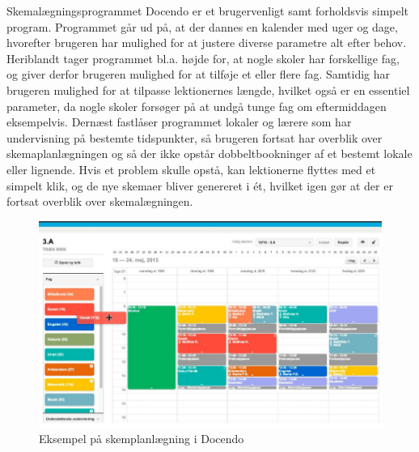 Skemalægningsprogrammet Docendo er et brugervenligt samt forholdsvis simpelt program. Programmet går ud på, at der dannes en kalender med uger og dage, hvorefter brugeren har mulighed for at justere diverse parametre alt efter behov. Heriblandt tager programmet bl.a. højde for, at nogle skoler har forskellige fag, og giver derfor brugeren mulighed for at tilføje et eller flere fag. Samtidig har brugeren mulighed for at tilpasse lektionernes længde, hvilket også er en essentiel parameter, da nogle skoler forsøger på at undgå tunge fag om eftermiddagen eksempelvis. Dernæst fastlåser programmet lokaler og lærere som har undervisning på bestemte tidspunkter, så brugeren fortsat har overblik over skemaplanlægningen og så der ikke opstår dobbeltbookninger af et bestemt lokale eller lignende. Hvis et problem skulle opstå, kan lektionerne flyttes med et simpelt klik, og de nye skemaer bliver genereret i ét, hvilket igen gør at der er fortsat overblik over skemalægningen\cite{docendo}.
\begin{figure}[!h]
  \centering
  \includegraphics[width=\textwidth]{partials/graphics/docendo.png}
    \caption{Eksempel på skemplanlægning i Docendo}
  \label{fig:docendo}
\end{figure}


